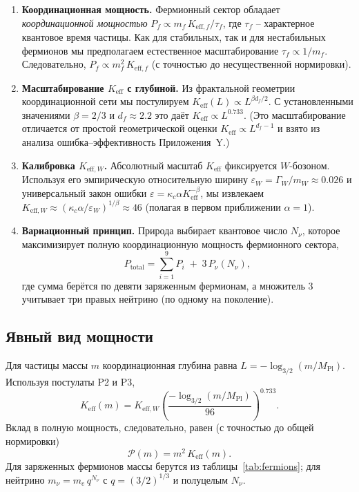 \documentclass[11pt,a4paper]{article}
\begin{document}
	\begin{enumerate}[label=\textbf{P\arabic*}:, leftmargin=*]
		\item \textbf{Координационная мощность.} Фермионный сектор обладает \emph{координационной мощностью} 
		\(P_f \propto m_f \, K_{\mathrm{eff},f}/\tau_f\), где \(\tau_f\) – характерное квантовое время частицы.  Как для стабильных, так и для нестабильных фермионов мы предполагаем естественное масштабирование \(\tau_f \propto 1/m_f\).  Следовательно, \(P_f \propto m_f^2 \, K_{\mathrm{eff},f}\) (с точностью до несущественной нормировки).
		\item \textbf{Масштабирование \(K_{\mathrm{eff}}\) с глубиной.} Из фрактальной геометрии координационной сети мы постулируем 
		\(K_{\mathrm{eff}}(L) \propto L^{\beta d_f/2}\).  С установленными значениями \(\beta=2/3\) и \(d_f\approx2.2\) это даёт \(K_{\mathrm{eff}} \propto L^{0.733}\).  (Это масштабирование отличается от простой геометрической оценки \(K_{\mathrm{eff}}\propto L^{d_f-1}\) и взято из анализа ошибка–эффективность Приложения~Y.)
		\item \textbf{Калибровка \(K_{\mathrm{eff},W}\).}  Абсолютный масштаб \(K_{\mathrm{eff}}\) фиксируется \(W\)-бозоном.  Используя его эмпирическую относительную ширину \(\varepsilon_W = \Gamma_W/m_W \approx 0.026\) и универсальный закон ошибки \(\varepsilon = \kappa_c \alpha K_{\mathrm{eff}}^{-\beta}\), мы извлекаем 
		\(K_{\mathrm{eff},W} \approx (\kappa_c \alpha / \varepsilon_W)^{1/\beta} \approx 46\) (полагая в первом приближении \(\alpha=1\)).
		\item \textbf{Вариационный принцип.}  Природа выбирает квантовое число \(N_{\nu}\), которое максимизирует полную координационную мощность фермионного сектора,
		\begin{equation}
			P_{\mathrm{total}} = \sum_{i=1}^{9} P_i \;+\; 3\,P_{\nu}(N_{\nu}),
		\end{equation}
		где сумма берётся по девяти заряженным фермионам, а множитель \(3\) учитывает три правых нейтрино (по одному на поколение).
	\end{enumerate}
	
	\subsection{Явный вид мощности}
	
	Для частицы массы \(m\) координационная глубина равна 
	\(L = -\log_{3/2}(m/M_{\mathrm{Pl}})\).  Используя постулаты P2 и P3,
	\begin{equation}
		K_{\mathrm{eff}}(m) = K_{\mathrm{eff},W} \left( \frac{-\log_{3/2}(m/M_{\mathrm{Pl}})}{96} \right)^{0.733}.
	\end{equation}
	Вклад в полную мощность, следовательно, равен (с точностью до общей нормировки)
	\begin{equation}
		\mathcal{P}(m) = m^2 \, K_{\mathrm{eff}}(m).
	\end{equation}
	Для заряженных фермионов массы берутся из таблицы~\ref{tab:fermions}; для нейтрино \(m_{\nu} = m_e \, q^{N_{\nu}}\) с \(q=(3/2)^{1/3}\) и полуцелым \(N_{\nu}\).
	
\end{document}
